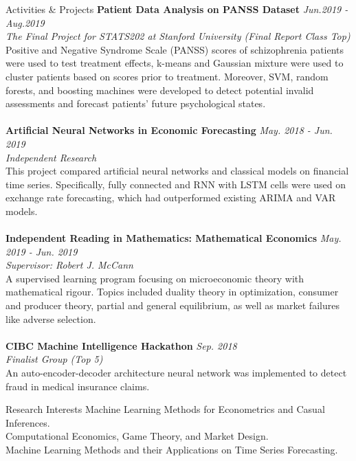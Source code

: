 \documentclass{resume} %
\begin{document}
\begin{rSection}{Activities \& Projects}
{\bf Patient Data Analysis on PANSS Dataset} \hfill \emph{Jun.2019 - Aug.2019}
\\ \emph{The Final Project for STATS202 at Stanford University (Final Report Class Top)}
\\ Positive and Negative Syndrome Scale (PANSS) scores of schizophrenia patients were used to test treatment effects, k-means and Gaussian mixture were used to cluster patients based on scores prior to treatment. Moreover, SVM, random forests, and boosting machines were developed to detect potential invalid assessments and forecast patients' future psychological states.
\\
\\{\bf Artificial Neural Networks in Economic Forecasting} \hfill \emph{May. 2018 - Jun. 2019}
\\ \emph{Independent Research}
\\ This project compared artificial neural networks and classical models on financial time series. Specifically, fully connected and RNN with LSTM cells were used on exchange rate forecasting, which had outperformed existing ARIMA and VAR models.
\\
\\{\bf Independent Reading in Mathematics: Mathematical Economics} \hfill \emph{May. 2019 - Jun. 2019}
\\ \emph{Supervisor: Robert J. McCann}
\\
A supervised learning program focusing on microeconomic theory with mathematical rigour. Topics included duality theory in optimization, consumer and producer theory, partial and general equilibrium, as well as market failures like adverse selection.
\\
\\{\bf CIBC Machine Intelligence Hackathon} \hfill \emph{Sep. 2018}
\\ \emph{Finalist Group (Top 5)}
\\
An auto-encoder-decoder architecture neural network was implemented to detect fraud in medical insurance claims.
\\

\end{rSection}


\begin{rSection}{Research Interests}
Machine Learning Methods for Econometrics and Casual Inferences.
\\Computational Economics, Game Theory, and Market Design.
\\Machine Learning Methods and their Applications on Time Series Forecasting.
\end{rSection}
\end{document}
